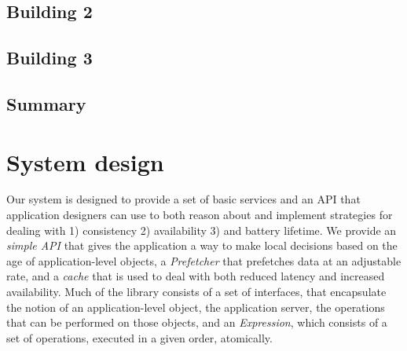 
\subsection{Building 2}


\subsection{Building 3}


\subsection{Summary}



\section{System design}
Our system is designed to provide a set of basic services and an API that application designers can use to both reason
about and implement strategies for dealing with 1) consistency 2) availability 3) and battery lifetime.  We provide
an \emph{simple API} that gives the application a way to make local decisions based on the age of application-level objects, 
a \emph{Prefetcher} that prefetches data at an adjustable rate, and a \emph{cache} that is used to deal with both reduced latency and 
increased availability.  Much of the library consists of a set of interfaces, that encapsulate the notion of an
application-level object, the application server, the operations that can be performed on those objects, and 
an \emph{Expression}, which consists of a set of operations, executed in a given order, atomically.

